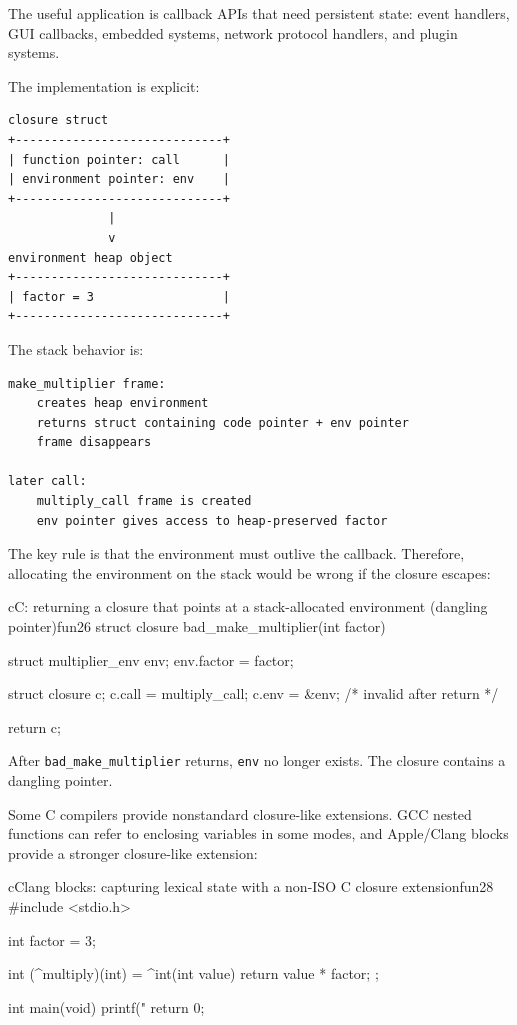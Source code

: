 The useful application is callback APIs that need persistent state: event handlers, GUI callbacks, embedded systems, network protocol handlers, and plugin systems.

The implementation is explicit:

\begin{verbatim}
closure struct
+-----------------------------+
| function pointer: call      |
| environment pointer: env    |
+-----------------------------+
              |
              v
environment heap object
+-----------------------------+
| factor = 3                  |
+-----------------------------+
\end{verbatim}

The stack behavior is:

\begin{verbatim}
make_multiplier frame:
    creates heap environment
    returns struct containing code pointer + env pointer
    frame disappears

later call:
    multiply_call frame is created
    env pointer gives access to heap-preserved factor
\end{verbatim}

The key rule is that the environment must outlive the callback. Therefore, allocating the environment on the stack would be wrong if the closure escapes:

\begin{codebox}[]{c}{C: returning a closure that points at a stack-allocated environment (dangling pointer)}{fun26}
struct closure bad_make_multiplier(int factor) {
    struct multiplier_env env;
    env.factor = factor;

    struct closure c;
    c.call = multiply_call;
    c.env = &env;  /* invalid after return */

    return c;
}
\end{codebox}



After \texttt{bad\_make\_multiplier} returns, \texttt{env} no longer exists. The closure contains a dangling pointer.

Some C compilers provide nonstandard closure-like extensions. GCC nested functions can refer to enclosing variables in some modes, and Apple/Clang blocks provide a stronger closure-like extension:

\begin{codebox}[]{c}{Clang blocks: capturing lexical state with a non-ISO C closure extension}{fun28}
#include <stdio.h>

int factor = 3;

int (^multiply)(int) = ^int(int value) {
    return value * factor;
};

int main(void) {
    printf("%
    return 0;
}
\end{codebox}


